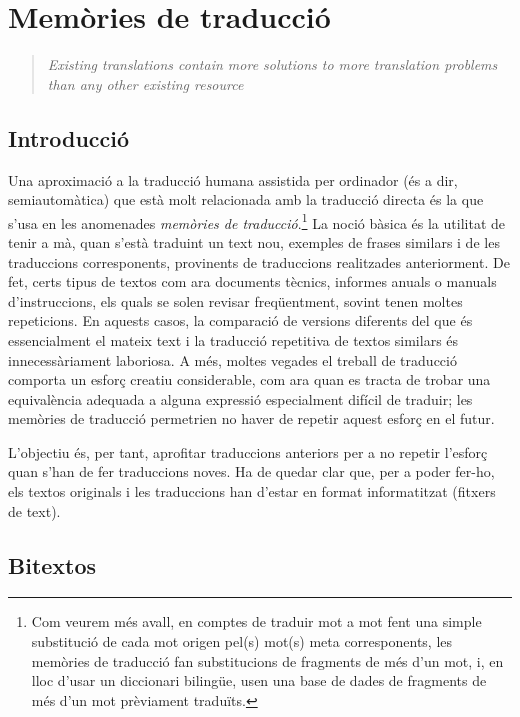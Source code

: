 \chapter{Memòries de traducció}
\label{se:memtrad}


\begin{quote}\textsl{Existing translations contain more solutions to more translation
  problems than any other existing resource} \citep{isabelle93p}
\end{quote}

\section{Introducció}

Una aproximació a la traducció humana assistida per ordinador (és a
dir, semiautomàtica) que està molt relacionada amb la traducció
directa és la que s'usa en les anomenades \emph{memòries de
  traducció}.\footnote{Com veurem més avall, en comptes de traduir mot a mot fent una simple
  substitució de cada mot origen pel(s) mot(s) meta corresponents, les
  memòries de traducció fan substitucions de fragments de més d'un
  mot, i, en lloc d'usar un diccionari bilingüe, usen una base de
  dades de fragments de més d'un mot prèviament traduïts.}  La noció
bàsica \citep{somers96b,samuelson-brown96b} és la utilitat de tenir a
mà, quan s'està traduint un text nou, exemples de frases similars i de
les traduccions corresponents, provinents de traduccions realitzades
anteriorment. De fet, certs tipus de textos com ara documents tècnics,
informes anuals o manuals d'instruccions, els quals se solen revisar
freqüentment, sovint tenen moltes repeticions. En aquests casos, la
comparació de versions diferents del que és essencialment el mateix
text i la traducció repetitiva de textos similars és innecessàriament
laboriosa. A més, moltes vegades el treball de traducció comporta un
esforç creatiu considerable, com ara quan es tracta de trobar una
equivalència adequada a alguna expressió especialment difícil de
traduir; les memòries de traducció permetrien no haver de repetir
aquest esforç en el futur.

L'objectiu és, per tant, aprofitar traduccions anteriors per a no
repetir l'esforç quan s'han de fer traduccions noves. Ha de quedar
clar que, per a poder fer-ho, els textos originals i les traduccions
han d'estar en format informatitzat (fitxers de text).

\section{Bitextos}
\label{ss:bitextos}

